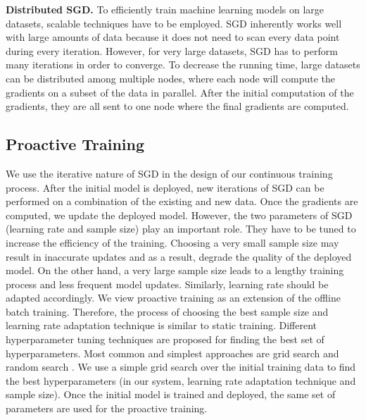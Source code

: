 \textbf{Distributed SGD.}
To efficiently train machine learning models on large datasets, scalable techniques have to be employed.
SGD inherently works well with large amounts of data because it does not need to scan every data point during every iteration.
However, for very large datasets, SGD has to perform many iterations in order to converge.
To decrease the running time, large datasets can be distributed among multiple nodes, where each node will compute the gradients on a subset of the data in parallel.
After the initial computation of the gradients, they are all sent to one node where the final gradients are computed.

\subsection{Proactive Training}
We use the iterative nature of SGD in the design of our continuous training process.
After the initial model is deployed, new iterations of SGD can be performed on a combination of the existing and new data.
Once the gradients are computed, we update the deployed model.
However, the two parameters of SGD (learning rate and sample size) play an important role.
They have to be tuned to increase the efficiency of the training.
Choosing  a very small sample size may result in inaccurate updates and as a result, degrade the quality of the deployed model.
On the other hand, a very large sample size leads to a lengthy training process and less frequent model updates.
Similarly, learning rate should be adapted accordingly.
We view proactive training as an extension of the offline batch training.
Therefore, the process of choosing the best sample size and learning rate adaptation technique is similar to static training.
Different hyperparameter tuning techniques are proposed for finding the best set of hyperparameters.
Most common and simplest approaches are grid search and random search \cite{bergstra2012random}.
We use a simple grid search over the initial training data to find the best hyperparameters (in our system, learning rate adaptation technique and sample size).
Once the initial model is trained and deployed, the same set of parameters are used for the proactive training.

